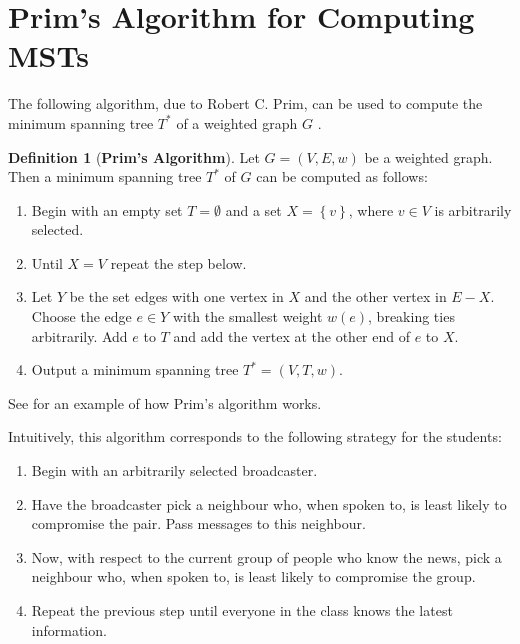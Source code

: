 \documentclass[a4paper,11pt]{report}
\theoremstyle{plain}
\theoremstyle{definition}
\newtheorem{defn}[thm]{Definition}
\begin{document}

\section{Prim's Algorithm for Computing MSTs}

The following algorithm, due to Robert C. Prim, can be used to compute
the minimum spanning tree $T^*$ of a weighted graph $G$
\cite[pp. 634--636]{clrs}.

\begin{defn}[{\bfseries Prim's Algorithm}] Let $G = (V, E, w)$ be a
weighted graph. Then a minimum spanning tree $T^*$ of $G$ can be computed as
follows:
\begin{enumerate}
    \item Begin with an empty set $T = \emptyset$ and a set $X
    = \left\{v\right\}$, where $v \in V$ is arbitrarily selected.
    \item Until $X = V$ repeat the step below.
    \item Let $Y$ be the set edges with one vertex in $X$ and the other
    vertex in $E - X$. Choose the edge $e \in Y$ with the smallest weight
    $w(e)$, breaking ties arbitrarily. Add $e$ to $T$ and add the vertex at
    the other end of $e$ to $X$.
    \item Output a minimum spanning tree $T^* = (V, T, w)$.
\end{enumerate}
\end{defn}

See  for an example of how Prim's algorithm works.

Intuitively, this algorithm corresponds to the following strategy for the
students:

\begin{enumerate}
    \item Begin with an arbitrarily selected broadcaster.
    \item Have the broadcaster pick a neighbour who, when spoken to, is least
    likely to compromise the pair. Pass messages to this neighbour.
    \item Now, with respect to the current group of people who know the news,
    pick a neighbour who, when spoken to, is least likely to compromise the
    group.
    \item Repeat the previous step until everyone in the class knows the latest
    information.
\end{enumerate}
\end{document}
